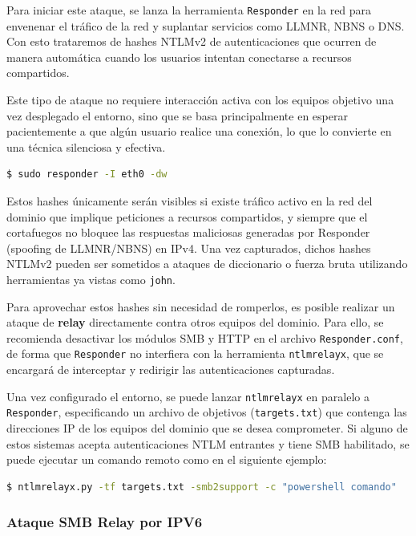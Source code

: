 \documentclass[a4paper, 11pt]{article}
\begin{document}
Para iniciar este ataque, se lanza la herramienta \texttt{Responder} en la red para envenenar el tráfico de la red y suplantar servicios como LLMNR, NBNS o DNS. Con esto trataremos de hashes NTLMv2 de autenticaciones que ocurren de manera automática cuando los usuarios intentan conectarse a recursos compartidos. 

Este tipo de ataque no requiere interacción activa con los equipos objetivo una vez desplegado el entorno, sino que se basa principalmente en esperar pacientemente a que algún usuario realice una conexión, lo que lo convierte en una técnica silenciosa y efectiva.

\begin{lstlisting}[language=bash, style=terminalstyle, caption=Captura de hashes NTLMv2 con Responder]
$ sudo responder -I eth0 -dw
\end{lstlisting}

Estos hashes únicamente serán visibles si existe tráfico activo en la red del dominio que implique peticiones a recursos compartidos, y siempre que el cortafuegos no bloquee las respuestas maliciosas generadas por Responder (spoofing de LLMNR/NBNS) en IPv4. Una vez capturados, dichos hashes NTLMv2 pueden ser sometidos a ataques de diccionario o fuerza bruta utilizando herramientas ya vistas como \texttt{john}.

Para aprovechar estos hashes sin necesidad de romperlos, es posible realizar un ataque de \textbf{relay} directamente contra otros equipos del dominio. Para ello, se recomienda desactivar los módulos SMB y HTTP en el archivo \texttt{Responder.conf}, de forma que \texttt{Responder} no interfiera con la herramienta \texttt{ntlmrelayx}, que se encargará de interceptar y redirigir las autenticaciones capturadas.

Una vez configurado el entorno, se puede lanzar \texttt{ntlmrelayx} en paralelo a \texttt{Responder}, especificando un archivo de objetivos (\texttt{targets.txt}) que contenga las direcciones IP de los equipos del dominio que se desea comprometer. Si alguno de estos sistemas acepta autenticaciones NTLM entrantes y tiene SMB habilitado, se puede ejecutar un comando remoto como en el siguiente ejemplo:

\begin{lstlisting}[language=bash, style=terminalstyle, caption=Relay NTLM y ejecución remota]
$ ntlmrelayx.py -tf targets.txt -smb2support -c "powershell comando"
\end{lstlisting}

\subsubsection*{Ataque SMB Relay por IPV6}
\end{document}
